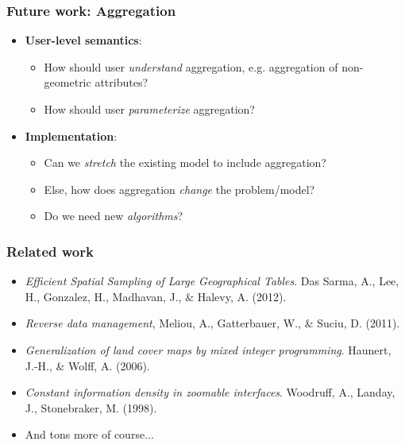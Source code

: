 \documentclass{beamer}
\begin{document}
\frame
{
  \frametitle{Future work: Aggregation}
  \begin{center}
  \end{center}

  \begin{itemize}
  \item \textbf{User-level semantics}:
  \begin{itemize}
  \item How should user \emph{understand} aggregation, e.g. aggregation of non-geometric attributes?
  \item How should user \emph{parameterize} aggregation?
  \end{itemize}
  \item \textbf{Implementation}:
  \begin{itemize}
  \item Can we \emph{stretch} the existing model to include aggregation?
  \item Else, how does aggregation \emph{change} the problem/model?
  \item Do we need new \emph{algorithms}?
  \end{itemize}
  \end{itemize}

  \begin{center}
  \end{center}

}



\frame
{
  \frametitle{Related work}

  \begin{itemize}
  \item \emph{Efficient Spatial Sampling of Large Geographical Tables}. Das Sarma, A., Lee, H., Gonzalez, H., Madhavan, J., \& Halevy, A. (2012).
  \item \emph{Reverse data management}, Meliou, A., Gatterbauer, W., \& Suciu, D. (2011).
  \item \emph{Generalization of land cover maps by mixed integer programming}. Haunert, J.-H., \& Wolff, A. (2006). 
  \item \emph{Constant information density in zoomable interfaces}. Woodruff, A., Landay, J., Stonebraker, M. (1998).
  \item And tons more of course...
  \end{itemize}
}
\end{document}
